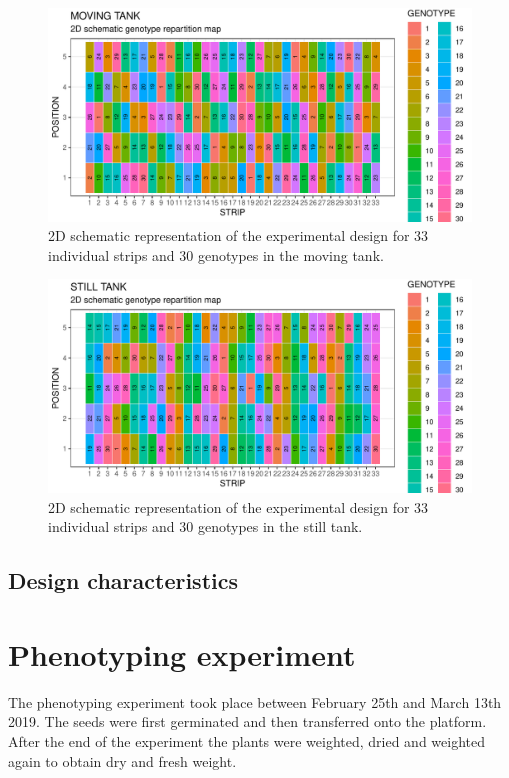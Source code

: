 \begin{figure}
    \includegraphics[width=\textwidth]{../../Figures/design_layout_moving.pdf} 
    \caption{2D schematic representation of the experimental design for 33 individual strips and 30 genotypes in the moving 
    tank.}
    \label{fig:moving_layout_30_geno}
\end{figure}

\begin{figure}
    \includegraphics[width=\textwidth]{../../Figures/design_layout_still.pdf} 
    \caption{2D schematic representation of the experimental design for 33 individual strips and 30 genotypes in the still 
    tank.}
    \label{fig:still_layout_30_geno}
\end{figure}

\subsection{Design characteristics}


\section{Phenotyping experiment}
The phenotyping experiment took place between February 25th and March 13th 2019. The seeds were first germinated and then transferred 
onto the platform. After the end of the experiment the plants were weighted, dried and weighted again to obtain dry and fresh 
weight.

